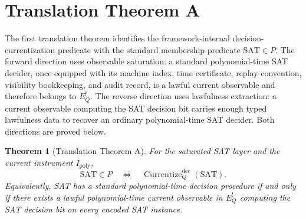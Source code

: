 \documentclass[11pt]{article}
\newcommand{\Ipoly}{I_{\mathrm{poly}}}
\newcommand{\EQbang}{E^{!}_{Q}}
\newcommand{\CurrentizeDec}{\operatorname{Currentize}^{\mathrm{dec}}_{Q}}
\newtheorem{theorem}{Theorem}[section]
\theoremstyle{definition}
\begin{document}
\section{Translation Theorem A}
\label{sec:translation-a}

The first translation theorem identifies the framework-internal
decision-currentization predicate with the standard membership
predicate \(\mathrm{SAT}\in P\).  The forward direction uses observable
saturation: a standard polynomial-time SAT decider, once equipped with
its machine index, time certificate, replay convention, visibility
bookkeeping, and audit record, is a lawful current observable and
therefore belongs to \(\EQbang\).  The reverse direction uses
lawfulness extraction: a current observable computing the SAT decision
bit carries enough typed lawfulness data to recover an ordinary
polynomial-time SAT decider.  Both directions are proved below.

\begin{theorem}[Translation Theorem A]
\label{thm:translation-A}
For the saturated SAT layer and the current instrument \(\Ipoly\),
\[
  \mathrm{SAT}\in P
  \quad\Longleftrightarrow\quad
  \CurrentizeDec(\mathrm{SAT}).
\]
Equivalently, SAT has a standard polynomial-time decision procedure if
and only if there exists a lawful polynomial-time current observable in
\(\EQbang\) computing the SAT decision bit on every encoded SAT
instance.
\end{theorem}
\end{document}
